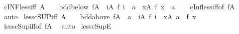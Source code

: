 \begin{isabellebody}
\endisatagproof
{\isafoldproof}%
%
\isadelimproof
\isanewline
%
\endisadelimproof
\isanewline
{}\isamarkupfalse%
\ cINF{\isacharunderscore}{\kern0pt}less{\isacharunderscore}{\kern0pt}iff{\isacharcolon}{\kern0pt}\ {\isachardoublequoteopen}A\ {\isasymnoteq}\ {\isacharbraceleft}{\kern0pt}{\isacharbraceright}{\kern0pt}\ {\isasymLongrightarrow}\ bdd{\isacharunderscore}{\kern0pt}below\ {\isacharparenleft}{\kern0pt}f{\isacharbackquote}{\kern0pt}A{\isacharparenright}{\kern0pt}\ {\isasymLongrightarrow}\ {\isacharparenleft}{\kern0pt}{\isasymSqinter}i{\isasymin}A{\isachardot}{\kern0pt}\ f\ i{\isacharparenright}{\kern0pt}\ {\isacharless}{\kern0pt}\ a\ {\isasymlongleftrightarrow}\ {\isacharparenleft}{\kern0pt}{\isasymexists}x{\isasymin}A{\isachardot}{\kern0pt}\ f\ x\ {\isacharless}{\kern0pt}\ a{\isacharparenright}{\kern0pt}{\isachardoublequoteclose}\isanewline
%
\isadelimproof
\ \ %
\endisadelimproof
%
\isatagproof
{}\isamarkupfalse%
\ cInf{\isacharunderscore}{\kern0pt}less{\isacharunderscore}{\kern0pt}iff{\isacharbrackleft}{\kern0pt}of\ {\isachardoublequoteopen}f{\isacharbackquote}{\kern0pt}A{\isachardoublequoteclose}{\isacharbrackright}{\kern0pt}\ \isamarkupfalse%
\ auto%
\endisatagproof
{\isafoldproof}%
%
\isadelimproof
\isanewline
%
\endisadelimproof
\isanewline
{}\isamarkupfalse%
\ less{\isacharunderscore}{\kern0pt}cSUP{\isacharunderscore}{\kern0pt}iff{\isacharcolon}{\kern0pt}\ {\isachardoublequoteopen}A\ {\isasymnoteq}\ {\isacharbraceleft}{\kern0pt}{\isacharbraceright}{\kern0pt}\ {\isasymLongrightarrow}\ bdd{\isacharunderscore}{\kern0pt}above\ {\isacharparenleft}{\kern0pt}f{\isacharbackquote}{\kern0pt}A{\isacharparenright}{\kern0pt}\ {\isasymLongrightarrow}\ a\ {\isacharless}{\kern0pt}\ {\isacharparenleft}{\kern0pt}{\isasymSqunion}i{\isasymin}A{\isachardot}{\kern0pt}\ f\ i{\isacharparenright}{\kern0pt}\ {\isasymlongleftrightarrow}\ {\isacharparenleft}{\kern0pt}{\isasymexists}x{\isasymin}A{\isachardot}{\kern0pt}\ a\ {\isacharless}{\kern0pt}\ f\ x{\isacharparenright}{\kern0pt}{\isachardoublequoteclose}\isanewline
%
\isadelimproof
\ \ %
\endisadelimproof
%
\isatagproof
{}\isamarkupfalse%
\ less{\isacharunderscore}{\kern0pt}cSup{\isacharunderscore}{\kern0pt}iff{\isacharbrackleft}{\kern0pt}of\ {\isachardoublequoteopen}f{\isacharbackquote}{\kern0pt}A{\isachardoublequoteclose}{\isacharbrackright}{\kern0pt}\ \isamarkupfalse%
\ auto%
\endisatagproof
{\isafoldproof}%
%
\isadelimproof
\isanewline
%
\endisadelimproof
\isanewline
{}\isamarkupfalse%
\ less{\isacharunderscore}{\kern0pt}cSupE{\isacharcolon}{\kern0pt}\isanewline

\end{isabellebody}
